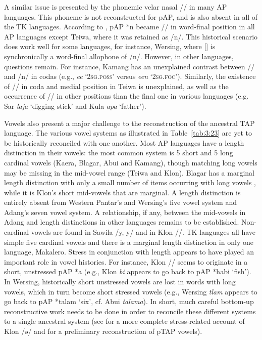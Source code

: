 A similar issue is presented by the phonemic velar nasal /{\ng}/ in many AP languages. This phoneme is not reconstructed for pAP, and is also absent in all of the TK languages. According to \citet{HoltonRobinsonTVhistory}, pAP *n became /{\ng}/ in word-final position in all AP languages except Teiwa, where it was retained as /n/. This historical scenario does work well for some languages, for instance, Wersing, where [{\ng}] is synchronically a word-final allophone of /n/. However, in other languages, questions remain. For instance, Kamang has an unexplained contrast between /{\ng}/ and /n/ in codas (e.g., \textit{ee{\ng}} `\textsc{2sg.poss'} versus \textit{een} `\textsc{2sg.foc'}). Similarly, the existence of /{\ng}/ in coda and medial position in Teiwa is unexplained, as well as the occurrence of /{\ng}/ in other positions than the final one in various languages (e.g. Sar \textit{la{\ng}ja} `digging stick' and Kula \textit{{\ng}apa} `father'). 

Vowels also present a major challenge to the reconstruction of the ancestral TAP language. The various vowel systems as illustrated in Table~\ref{tab:3:23} are yet to be historically reconciled with one another. Most AP languages have a length distinction in their vowels: the most common system is 5 short and 5 long cardinal vowels (Kaera, Blagar, Abui and Kamang), though matching long vowels may be missing in the mid-vowel range (Teiwa and Klon). Blagar has a marginal length distinction with only a small number of items occurring with long vowels \citep{Steinhauerta}, while it is Klon's short mid-vowels that are marginal. A length distinction is entirely absent from Western Pantar's and Wersing's five vowel system and Adang's seven vowel system. A relationship, if any, between the mid-vowels in Adang and length distinctions in other languages remains to be established. Non-cardinal vowels are found in Sawila /y, y{\textlengthmark}/ and in Klon /{\textschwa}/. TK languages all have simple five cardinal vowels and there is a marginal length distinction in only one language, Makalero. Stress in conjunction with length appears to have played an important role in vowel histories. For instance, Klon /{\textschwa}/ seems to originate in a short, unstressed pAP *a (e.g., Klon \textit{{\textschwa}bi} appears to go back to pAP *ha{\textprimstress}bi `fish'). In Wersing, historically short unstressed vowels are lost in words with long vowels, which in turn become short stressed vowels (e.g., Wersing \textit{tlam} appears to go back to pAP *tala{\textlengthmark}m `six', cf. Abui \textit{tala{\textlengthmark}ma}). In short, much careful bottom-up reconstructive work needs to be done in order to reconcile these different systems to a single ancestral system (see \citealt{Heston2016} for a more complete stress-related account of Klon /ə/ and \citealt{Hestonforthcoming} for a preliminary reconstruction of pTAP vowels).
 

